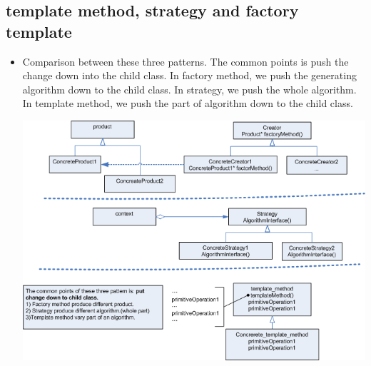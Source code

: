 \documentclass[a4paper,11pt,twoside]{book}
\begin{document}
\subsection{template method, strategy and factory template}
\begin{itemize}
	\item Comparison between these three patterns. The common points is push the change down into the child class. In factory method, we push the generating algorithm down to the child class. In strategy, we push the whole algorithm. In template method, we push the part of algorithm down to the child class.

\begin{center}
	\includegraphics[width=0.93\linewidth]{pics/template_method.png}
\end{center}
	 
\end{itemize}
\end{document}
